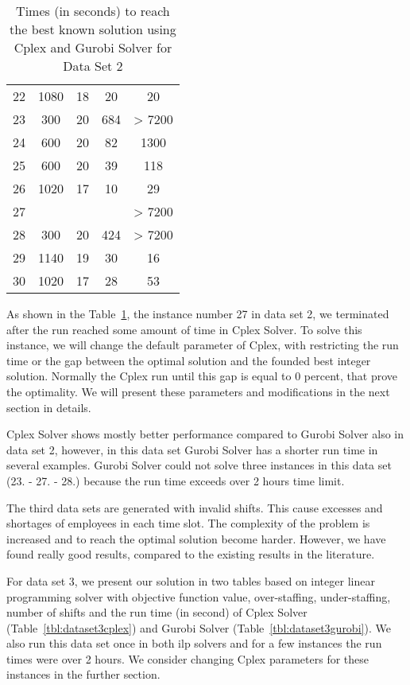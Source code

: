\begin{table}
\begin{tabular}{ccccc}
22 &  1080	& 18 & 20 & 20  \\

23 &  300 	& 20 & 684 &  > 7200   \\

24 &  600	& 20 & 82 & 1300   \\

25 &  600	& 20 & 39 &  118    \\

26 &  1020	& 17 & 10 &  29 \\

27 &  	&  &  & > 7200  \\

28 & 300 	& 20 & 424 & > 7200  \\

29 & 1140	& 19 & 30 & 16 \\

30 &  1020	& 17 & 28 &  53 \\
\hline
\end{tabular}
\caption{Times (in seconds) to reach the best known solution using Cplex and Gurobi Solver for Data Set 2}
\label{tbl:dataset2}
\end{table}



As shown in the Table~\ref{tbl:dataset2}, the instance number 27 in data set 2, we terminated after the run reached some amount of time in Cplex Solver. To solve this instance, we will change the default parameter of Cplex, with restricting  the run time or the gap between the optimal solution and the founded best integer solution. Normally the Cplex run until this gap is equal to 0 percent, that prove the optimality. We will present these parameters and modifications in the next section in details.

Cplex Solver shows mostly better performance compared to Gurobi Solver also in data set 2, however, in this data set Gurobi Solver has a shorter run time  in several examples. Gurobi Solver could not solve three instances in this data set (23. - 27. - 28.) because the run time exceeds over 2 hours time limit.


The third data sets are generated with invalid shifts. This cause excesses and shortages of employees in each time slot. The complexity of the problem is increased and to reach the optimal solution become harder. However, we have found really good results, compared to the existing results in the literature.  

For data set 3, we present our solution in two tables based on integer linear programming solver with objective function value, over-staffing, under-staffing, number of shifts and the run time  (in second) of Cplex Solver (Table~\ref{tbl:dataset3cplex}) and Gurobi Solver (Table~\ref{tbl:dataset3gurobi}). We also run this data set once in both ilp solvers and for a few instances the run times were over 2 hours. We consider changing Cplex parameters for these instances in the further section.



